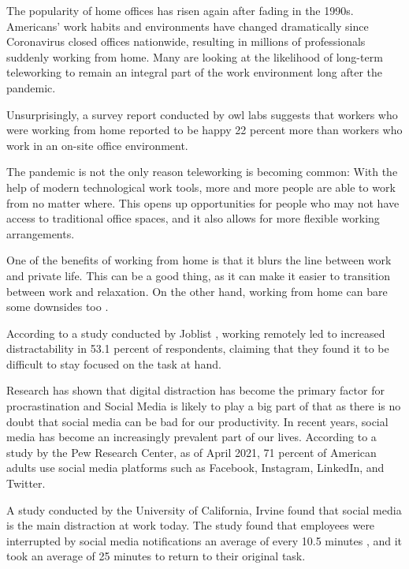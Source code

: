


The popularity of home offices has risen again after fading in the 1990s.
Americans' work habits and environments have changed dramatically since Coronavirus
closed offices nationwide, resulting in millions of professionals suddenly working from home.
Many are looking at the likelihood of long-term teleworking
to remain an integral part of the work environment long after the pandemic.\cite{BibEntry2020Jun}

Unsurprisingly, a survey report conducted by owl labs suggests that workers who were working from home
reported to be happy 22 percent more than workers who work in an on-site office environment.\cite{BibEntry2022Nov}

The pandemic is not the only reason teleworking is becoming common:
With the help of modern technological work tools,  more and more people are able to work from no matter where.
This opens up opportunities for people who may not have access to traditional office spaces,
and it also allows for more flexible working arrangements.


One of the benefits of working from home is that it blurs the line
between work and private life.
This can be a good thing, as it can make it easier to transition between work and relaxation.
On the other hand, working from home can bare some downsides too \cite{Marsh2022Mar}.

According to a study conducted by Joblist \cite{Joblist2022Nov},
working remotely led to increased distractability in 53.1 percent of respondents, claiming
that they found it to be difficult to stay focused on the task at hand.


Research has shown that digital distraction has become the primary factor for procrastination\cite{Lu2014Dec}
and Social Media is likely to play a big part of that as there
is no doubt that social media can be bad for our productivity.\cite{Vithayathil2018Jan}
In recent years, social media has become an increasingly prevalent part of our lives.
According to a study by the
Pew Research Center, as of April 2021,  71 percent of
American adults use social media platforms such as
Facebook, Instagram, LinkedIn, and Twitter.\cite{PewResearch2022Nov}

A study conducted by the University of California,
Irvine found that social media is the main distraction at work today.
The study found that employees were interrupted by social media
notifications an average of every 10.5 minutes
, and it took an average of 25 minutes to return to their original task.\cite{Mark2008Jan}


